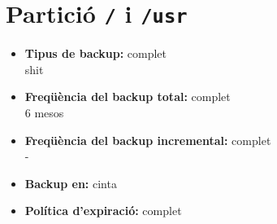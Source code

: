 
\section{Partici\'o {\tt /} i \tt{/usr}}%
\label{sec:part_sda1}

\newcommand{\entry}[2]{\item[] \textbf{#1:} #2 \\ }

\begin{itemize}
    \entry{Tipus de backup}{complet} shit
    \entry{Freqüència del backup total}{complet} 6 mesos
    \entry{Freqüència del backup incremental}{complet} -
    \entry{Backup en}{cinta}
    \entry{Política d'expiració}{complet}
\end{itemize}

